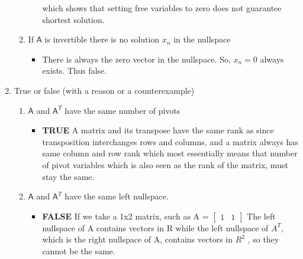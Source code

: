 \documentclass[a4paper, 11pt]{article}
\newcommand{\mat}[1]{\boldsymbol { \mathsf{#1}} }
\begin{document}
\begin{enumerate}
\begin{enumerate}[label=(\alph*)]
\begin{itemize}
    which shows that setting free variables to zero does not guarantee shortest solution.
    

    
\end{itemize}
\item If $\mat A$ is invertible there is no solution $x_n$ in the nullspace
\begin{itemize}
    \item
   There is always the zero vector in the nullspace. So, $x_n = 0$ always exists. Thus false.
\end{itemize}
\end{enumerate}

\item True or false (with a reason or a counterexample)
\begin{enumerate}[label=(\alph*)]
\item $\mat A$ and $\mat A^T$ have the same number of pivots
\begin{itemize}
    \item \textbf{TRUE} A matrix and its transpose have the same rank as since transposition interchanges rows and columns, and a matrix always has same column and row rank which most essentially means that number of pivot variables which is also seen as the rank of the matrix, must stay the same.
\end{itemize}
\item $\mat A$ and $\mat A^T$ have the same left nullspace.
\begin{itemize}
    \item \textbf{FALSE}  If we take a 1x2 matrix, such as A =
    $\begin{bmatrix}
    1 & 1
    \end{bmatrix}$
The left nullspace of A contains vectors in R while the left nullspace of $A^T$, which
is the right nullspace of A, contains vectors in $R^2$
, so they cannot be the same.
\end{itemize}


\end{enumerate}
\end{enumerate}
\end{document}
